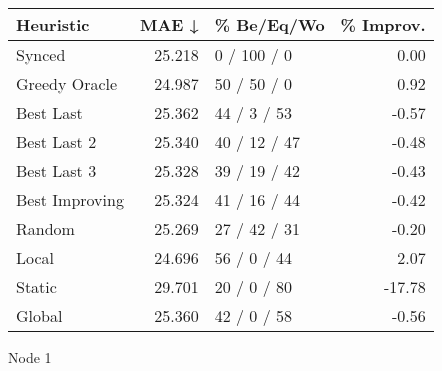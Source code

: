\begin{tabular}{lrlr}
\toprule
\textbf{Heuristic} & \textbf{MAE ↓} & \textbf{\% Be/Eq/Wo} & \textbf{\% Improv.} \\
\midrule
            Synced &         25.218 &          0 / 100 / 0 &                0.00 \\
     Greedy Oracle &         24.987 &          50 / 50 / 0 &                0.92 \\
         Best Last &         25.362 &          44 / 3 / 53 &               -0.57 \\
       Best Last 2 &         25.340 &         40 / 12 / 47 &               -0.48 \\
       Best Last 3 &         25.328 &         39 / 19 / 42 &               -0.43 \\
    Best Improving &         25.324 &         41 / 16 / 44 &               -0.42 \\
            Random &         25.269 &         27 / 42 / 31 &               -0.20 \\
             Local &         24.696 &          56 / 0 / 44 &                2.07 \\
            Static &         29.701 &          20 / 0 / 80 &              -17.78 \\
            Global &         25.360 &          42 / 0 / 58 &               -0.56 \\
\bottomrule
\end{tabular}
\caption{Node 1}
\label{tab:iid_lr01_le2_bs2_1}
